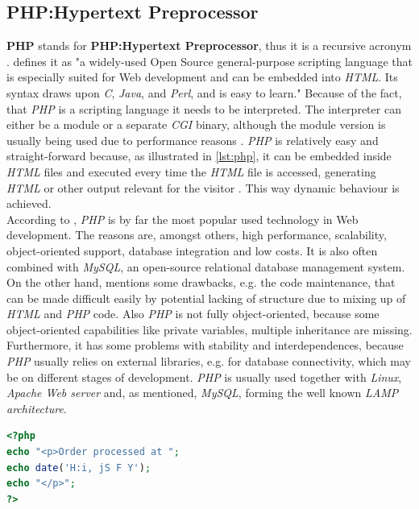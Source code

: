 \documentclass[
  a4paper,               %
  twoside,               %
  headings=small,        %
  DIV=12,                %
  BCOR=1cm,              %
  headinclude=true,      %
  footinclude=true,      %
  numbers=noenddot,      %
  11pt]{scrartcl}        %
\begin{document}
\subsection{PHP:Hypertext Preprocessor}

\textbf{PHP} stands for \textbf{PHP:Hypertext Preprocessor}, thus it is a recursive acronym \cite{PHPPreface}. \cite{PHPPreface} defines it as "a widely-used Open Source general-purpose scripting language that is especially suited for Web development and can be embedded into \textit{HTML}. Its syntax draws upon \textit{C}, \textit{Java}, and \textit{Perl}, and is easy to learn." Because of the fact, that \textit{PHP} is a scripting language it needs to be interpreted. The interpreter can either be a module or a separate \textit{CGI} binary, although the module version is usually being used due to performance reasons \cite{welling2008php}. \textit{PHP} is relatively easy and straight-forward because, as illustrated in \autoref{lst:php}, it can be embedded inside \textit{HTML} files and executed every time the \textit{HTML} file is accessed, generating \textit{HTML} or other output relevant for the visitor \cite{welling2008php}. This way dynamic behaviour is achieved.\\
According to \cite{w3TechsStats}, \textit{PHP} is by far the most popular used technology in Web development. The reasons are, amongst others, high performance, scalability, object-oriented support, database integration and low costs. It is also often combined with \textit{MySQL}, an open-source relational database management system. On the other hand, \cite{bowen2002apache} mentions some drawbacks, e.g. the code maintenance, that can be made difficult easily by potential lacking of structure due to mixing up of \textit{HTML} and \textit{PHP} code. Also \textit{PHP} is not fully object-oriented, because some object-oriented capabilities like private variables, multiple inheritance are missing. Furthermore, it has some problems with stability and interdependences, because \textit{PHP} usually relies on external libraries, e.g. for database connectivity, which may be on different stages of development. \textit{PHP} is usually used together with \textit{Linux}, \textit{Apache Web server} and, as mentioned, \textit{MySQL}, forming the well known \textit{LAMP architecture}. 


\begin{lstlisting}[language=php, captionpos=b,caption={PHP embedded in HTML. Taken from \cite{welling2008php}},label=lst:php]
<?php
echo "<p>Order processed at ";
echo date('H:i, jS F Y');
echo "</p>";
?>

\end{lstlisting}
\end{document}
